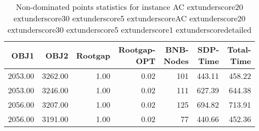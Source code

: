 \begin{table}
\caption{Non-dominated points statistics for instance AC	extunderscore20	extunderscore30	extunderscore5	extunderscoreAC	extunderscore20	extunderscore30	extunderscore5	extunderscore1	extunderscoredetailed}
\label{tab:stats/AC_20_30_5_AC_20_30_5_1_detailed}
\begin{tabular}{rrrrrrr}
\toprule
OBJ1 & OBJ2 & Rootgap & Rootgap-OPT & BNB-Nodes & SDP-Time & Total-Time \\
\midrule
2053.00 & 3262.00 & 1.00 & 0.02 & 101 & 443.11 & 458.22 \\
2053.00 & 3246.00 & 1.00 & 0.02 & 111 & 627.39 & 644.38 \\
2056.00 & 3207.00 & 1.00 & 0.02 & 125 & 694.82 & 713.91 \\
2056.00 & 3191.00 & 1.00 & 0.02 & 77 & 440.66 & 452.36 \\
\bottomrule
\end{tabular}
\end{table}
